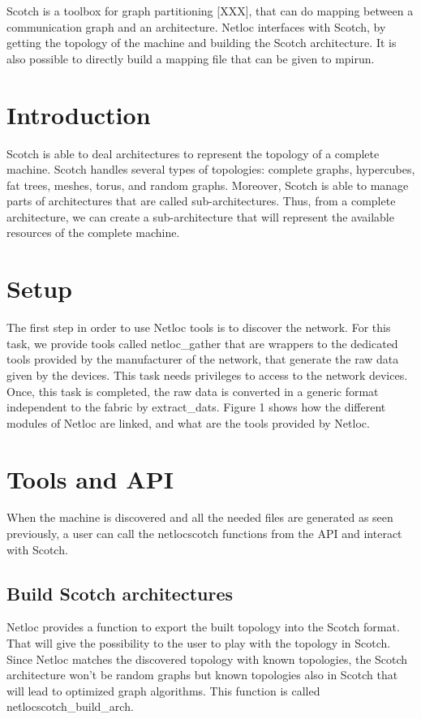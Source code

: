 

Scotch is a toolbox for graph partitioning \mbox{[}X\+XX\mbox{]}, that can do mapping between a communication graph and an architecture. Netloc interfaces with Scotch, by getting the topology of the machine and building the Scotch architecture. It is also possible to directly build a mapping file that can be given to {\ttfamily mpirun}.

 \hypertarget{a00397_scotch_intro}{}\section{Introduction}\label{a00397_scotch_intro}
Scotch is able to deal architectures to represent the topology of a complete machine. Scotch handles several types of topologies\+: complete graphs, hypercubes, fat trees, meshes, torus, and random graphs. Moreover, Scotch is able to manage parts of architectures that are called sub-\/architectures. Thus, from a complete architecture, we can create a sub-\/architecture that will represent the available resources of the complete machine.

 \hypertarget{a00397_scotch_setup}{}\section{Setup}\label{a00397_scotch_setup}
The first step in order to use Netloc tools is to discover the network. For this task, we provide tools called netloc\+\_\+gather that are wrappers to the dedicated tools provided by the manufacturer of the network, that generate the raw data given by the devices. This task needs privileges to access to the network devices. Once, this task is completed, the raw data is converted in a generic format independent to the fabric by extract\+\_\+dats. Figure 1 shows how the different modules of Netloc are linked, and what are the tools provided by Netloc.

 \hypertarget{a00397_scotch_tools_api}{}\section{Tools and A\+PI}\label{a00397_scotch_tools_api}
When the machine is discovered and all the needed files are generated as seen previously, a user can call the netlocscotch functions from the A\+PI and interact with Scotch.\hypertarget{a00397_netlocscotch_arch}{}\subsection{Build Scotch architectures}\label{a00397_netlocscotch_arch}
Netloc provides a function to export the built topology into the Scotch format. That will give the possibility to the user to play with the topology in Scotch. Since Netloc matches the discovered topology with known topologies, the Scotch architecture won’t be random graphs but known topologies also in Scotch that will lead to optimized graph algorithms. This function is called netlocscotch\+\_\+build\+\_\+arch.


